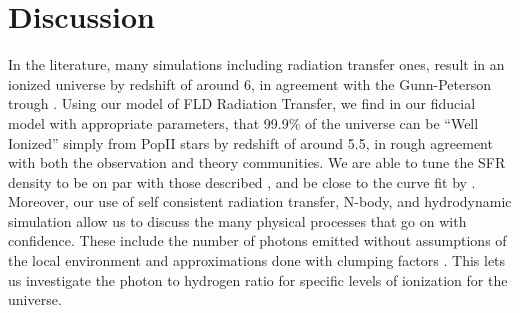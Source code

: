 \section{Discussion}
\label{Discussion}



In the literature, many simulations including radiation transfer ones, result in an ionized universe by redshift of around 6, in agreement with the Gunn-Peterson trough \citep{GunnPeterson1965, FanEtAl2006, TracCen2007}.  Using our model of FLD Radiation Transfer, we find in our fiducial model with appropriate parameters, that 99.9\% of the universe can be ``Well Ionized'' simply from PopII stars by redshift of around 5.5, in rough agreement with both the observation and theory communities.  We are able to tune the SFR density to be on par with those described \cite{BouwensEtAl2011}, and be close to the curve fit by \citep{HaardtMadau2012}.  Moreover, our use of self consistent radiation transfer, N-body, and hydrodynamic simulation allow us to discuss the many physical processes that go on with confidence.  These include the number of photons emitted without assumptions of the local environment and approximations done with clumping factors \citep{IlievEtAl2006,PawlikEtAl2009, RaicevicTheuns2011}. This lets us investigate the photon to hydrogen ratio for specific levels of ionization for the universe.


